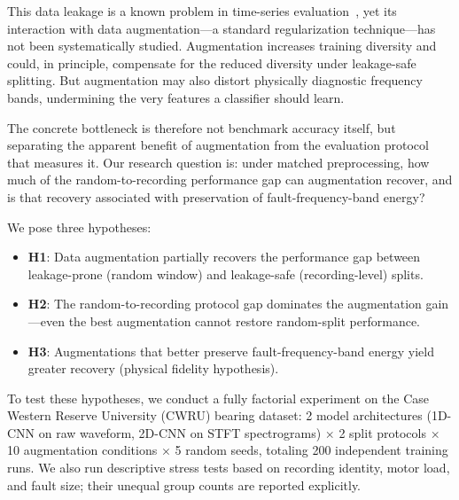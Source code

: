 ﻿\documentclass[11pt,a4paper]{article}
\begin{document}
This data leakage is a known problem in time-series evaluation~\cite{bergmeir2012use,cerqueira2020evaluating}, yet its interaction with data augmentation---a standard regularization technique---has not been systematically studied. Augmentation increases training diversity and could, in principle, compensate for the reduced diversity under leakage-safe splitting. But augmentation may also distort physically diagnostic frequency bands, undermining the very features a classifier should learn.

The concrete bottleneck is therefore not benchmark accuracy itself, but separating the apparent benefit of augmentation from the evaluation protocol that measures it. Our research question is: under matched preprocessing, how much of the random-to-recording performance gap can augmentation recover, and is that recovery associated with preservation of fault-frequency-band energy?

We pose three hypotheses:
\begin{itemize}[nosep]
    \item \textbf{H1}: Data augmentation partially recovers the performance gap between leakage-prone (random window) and leakage-safe (recording-level) splits.
    \item \textbf{H2}: The random-to-recording protocol gap dominates the augmentation gain---even the best augmentation cannot restore random-split performance.
    \item \textbf{H3}: Augmentations that better preserve fault-frequency-band energy yield greater recovery (physical fidelity hypothesis).
\end{itemize}

To test these hypotheses, we conduct a fully factorial experiment on the Case Western Reserve University (CWRU) bearing dataset: 2 model architectures (1D-CNN on raw waveform, 2D-CNN on STFT spectrograms) $\times$ 2 split protocols $\times$ 10 augmentation conditions $\times$ 5 random seeds, totaling 200 independent training runs. We also run descriptive stress tests based on recording identity, motor load, and fault size; their unequal group counts are reported explicitly.
\end{document}
